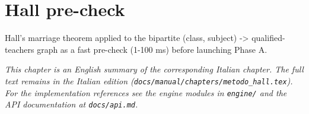 \chapter{Hall pre-check}
\label{ch:metodo_hall_en}

Hall's marriage theorem applied to the bipartite (class, subject) -> qualified-teachers graph as a fast pre-check (1-100 ms) before launching Phase A.

\medskip
\noindent
\textit{This chapter is an English summary of the corresponding Italian chapter. The full text remains in the Italian edition (\texttt{docs/manual/chapters/metodo\_hall.tex}). For the implementation references see the engine modules in \texttt{engine/} and the API documentation at \texttt{docs/api.md}.}
